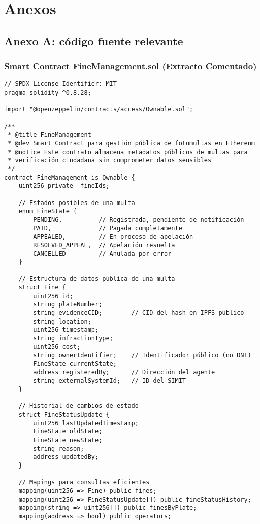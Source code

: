 \section{Anexos}

\subsection{Anexo A: código fuente relevante}

\subsubsection{Smart Contract FineManagement.sol (Extracto Comentado)}

\begin{verbatim}
// SPDX-License-Identifier: MIT
pragma solidity ^0.8.28;

import "@openzeppelin/contracts/access/Ownable.sol";

/**
 * @title FineManagement
 * @dev Smart Contract para gestión pública de fotomultas en Ethereum
 * @notice Este contrato almacena metadatos públicos de multas para
 * verificación ciudadana sin comprometer datos sensibles
 */
contract FineManagement is Ownable {
    uint256 private _fineIds;

    // Estados posibles de una multa
    enum FineState { 
        PENDING,          // Registrada, pendiente de notificación
        PAID,             // Pagada completamente
        APPEALED,         // En proceso de apelación
        RESOLVED_APPEAL,  // Apelación resuelta
        CANCELLED         // Anulada por error
    }

    // Estructura de datos pública de una multa
    struct Fine {
        uint256 id;
        string plateNumber;
        string evidenceCID;        // CID del hash en IPFS público
        string location;
        uint256 timestamp;
        string infractionType;
        uint256 cost;
        string ownerIdentifier;    // Identificador público (no DNI)
        FineState currentState;
        address registeredBy;      // Dirección del agente
        string externalSystemId;   // ID del SIMIT
    }

    // Historial de cambios de estado
    struct FineStatusUpdate {
        uint256 lastUpdatedTimestamp;
        FineState oldState;
        FineState newState;
        string reason;
        address updatedBy;
    }

    // Mapings para consultas eficientes
    mapping(uint256 => Fine) public fines;
    mapping(uint256 => FineStatusUpdate[]) public fineStatusHistory;
    mapping(string => uint256[]) public finesByPlate;
    mapping(address => bool) public operators;


\end{verbatim}
